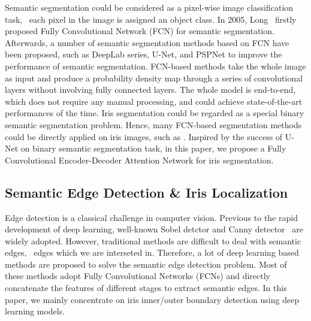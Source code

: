 \documentclass[journal]{IEEEtran}
\begin{document}
Semantic segmentation could be considered as a pixel-wise image classification task, \ie~each pixel in the image is assigned an object class. In 2005, Long\cite{long2015fully} \etal~firstly proposed Fully Convolutional Network (FCN) for semantic segmentation. Afterwards, a number of semantic segmentation methods based on FCN have been proposed, such as DeepLab series\cite{chen2014semantic,chen2016deeplab,chen2017rethinking}, U-Net\cite{ronneberger2015u-net}, and PSPNet\cite{zhao2017pyramid} to improve the performance of semantic segmentation. FCN-based methods take the whole image as input and produce a probability density map through a series of convolutional layers without involving fully connected layers. The whole model is end-to-end, which does not require any manual processing, and could achieve state-of-the-art performances of the time. Iris segmentation could be regarded as a special binary semantic segmentation problem. Hence, many FCN-based segmentation methods could be directly applied on iris images, such as \cite{liu2016accurate,Jalilian2017Domain,Bazrafkan2018An,arsalan2018irisdensenet}.
Inspired by the success of U-Net on binary semantic segmentation task\cite{LinkNet,TernausNet,Robot2018}, in this paper, we propose a Fully Convolutional Encoder-Decoder Attention Network for iris segmentation.

\subsection{Semantic Edge Detection \& Iris Localization}
Edge detection is a classical challenge in computer vision. Previous to the rapid development of deep learning, well-known Sobel detctor and Canny detector\cite{canny1986computational} \etc~are widely adopted. However, traditional methods are difficult to deal with semantic edges, \ie~edges which we are interseted in. Therefore, a lot of deep learning based methods\cite{xie2015hed,yu2017casenet} are proposed to solve the semantic edge detection problem. Most of these methods adopt Fully Convolutional Networks (FCNs) and directly concatenate the features of different stages to extract semantic edges. In this paper, we mainly concentrate on iris inner/outer boundary detection using deep learning models.
\end{document}
